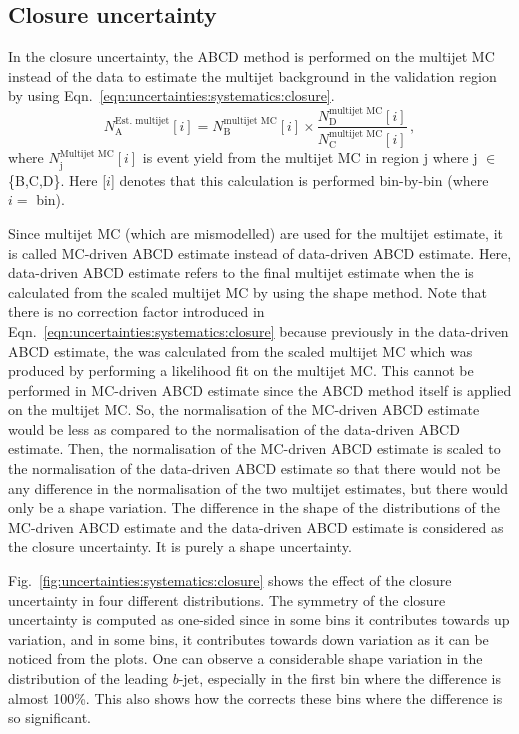 \subsection{Closure uncertainty}
\label{sec:uncertainties:systematics:closure}
In the closure uncertainty, the ABCD method is performed on the multijet MC instead of the data to estimate the multijet background in the validation region by using Eqn.\ \ref{eqn:uncertainties:systematics:closure}.
\begin{equation}
N_{\text{A}}^{\text{Est.\ multijet}}[i] = N_{\text{B}}^{\text{multijet MC}}[i] \times \frac{N_{\text{D}}^{\text{multijet MC}}[i]}{N_{\text{C}}^{\text{multijet MC}}[i]} \,,
\label{eqn:uncertainties:systematics:closure}
\end{equation}
where $N_{\text{j}}^{\text{Multijet MC}}[i]$ is event yield from the multijet MC in region j where j $\in$ \{B,C,D\}. Here [$i$] denotes that this calculation is performed bin-by-bin (where $i=$ bin).
 
Since multijet MC (which are mismodelled) are used for the multijet estimate, it is called MC-driven ABCD estimate instead of data-driven ABCD estimate. Here, data-driven ABCD estimate refers to the final multijet estimate when the \R is calculated from the scaled multijet MC by using the shape method. Note that there is no correction factor introduced in Eqn.\ \ref{eqn:uncertainties:systematics:closure} because previously in the data-driven ABCD estimate, the \R was calculated from the scaled multijet MC which was produced by performing a likelihood fit on the multijet MC. This cannot be performed in MC-driven ABCD estimate since the ABCD method itself is applied on the multijet MC. So, the normalisation of the MC-driven ABCD estimate would be less as compared to the normalisation of the data-driven ABCD estimate. Then, the normalisation of the MC-driven ABCD estimate is scaled to the normalisation of the data-driven ABCD estimate so that there would not be any difference in the normalisation of the two multijet estimates, but there would only be a shape variation. The difference in the shape of the distributions of the MC-driven ABCD estimate and the data-driven ABCD estimate is considered as the closure uncertainty. It is purely a shape uncertainty.

Fig.\ \ref{fig:uncertainties:systematics:closure} shows the effect of the closure uncertainty in four different distributions. The symmetry of the closure uncertainty is computed as one-sided since in some bins it contributes towards up variation, and in some bins, it contributes towards down variation as it can be noticed from the plots. One can observe a considerable shape variation in the \pt distribution of the leading $b$-jet, especially in the first bin where the difference is almost 100\%. This also shows how the \R corrects these bins where the difference is so significant.


